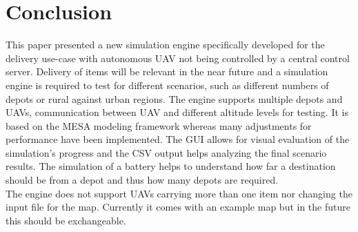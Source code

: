 \section{Conclusion}
This paper presented a new simulation engine specifically developed for the delivery use-case with autonomous UAV not being controlled by a central control server. Delivery of items will be relevant in the near future and a simulation engine is required to test for different scenarios, such as different numbers of depots or rural against urban regions. The engine supports multiple depots and UAVs, communication between UAV and different altitude levels for testing. It is based on the MESA modeling framework whereas many adjustments for performance have been implemented. The GUI allows for visual evaluation of the simulation's progress and the CSV output helps analyzing the final scenario results. The simulation of a battery helps to understand how far a destination should be from a depot and thus how many depots are required. \\
The engine does not support UAVs carrying more than one item nor changing the input file for the map. Currently it comes with an example map but in the future this should be exchangeable. 



